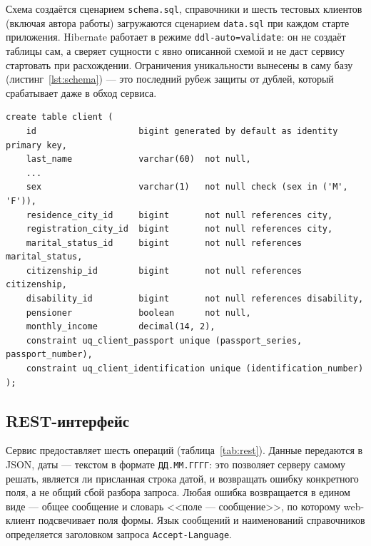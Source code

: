 \documentclass[14pt,a4paper]{extarticle}
\begin{document}
Схема создаётся сценарием \texttt{schema.sql}, справочники и шесть тестовых клиентов
(включая автора работы) загружаются сценарием \texttt{data.sql} при каждом старте приложения.
Hibernate работает в режиме \texttt{ddl-auto=validate}: он не создаёт таблицы сам, а сверяет
сущности с явно описанной схемой и не даст сервису стартовать при расхождении. Ограничения
уникальности вынесены в саму базу (листинг~\ref{lst:schema}) --- это последний рубеж защиты
от дублей, который срабатывает даже в обход сервиса.

\begin{lstlisting}[style=sql, caption={Фрагмент \texttt{schema.sql}: ссылки на справочники и уникальность}, label={lst:schema}]
create table client (
    id                    bigint generated by default as identity primary key,
    last_name             varchar(60)  not null,
    ...
    sex                   varchar(1)   not null check (sex in ('M', 'F')),
    residence_city_id     bigint       not null references city,
    registration_city_id  bigint       not null references city,
    marital_status_id     bigint       not null references marital_status,
    citizenship_id        bigint       not null references citizenship,
    disability_id         bigint       not null references disability,
    pensioner             boolean      not null,
    monthly_income        decimal(14, 2),
    constraint uq_client_passport unique (passport_series, passport_number),
    constraint uq_client_identification unique (identification_number)
);
\end{lstlisting}

\subsection{REST-интерфейс}

Сервис предоставляет шесть операций (таблица~\ref{tab:rest}). Данные передаются в JSON,
даты --- текстом в формате \texttt{ДД.ММ.ГГГГ}: это позволяет серверу самому решать, является
ли присланная строка датой, и возвращать ошибку конкретного поля, а не общий сбой разбора
запроса. Любая ошибка возвращается в едином виде --- общее сообщение и словарь
<<поле --- сообщение>>, по которому web-клиент подсвечивает поля формы. Язык сообщений и
наименований справочников определяется заголовком запроса \texttt{Accept-Language}.
\end{document}
